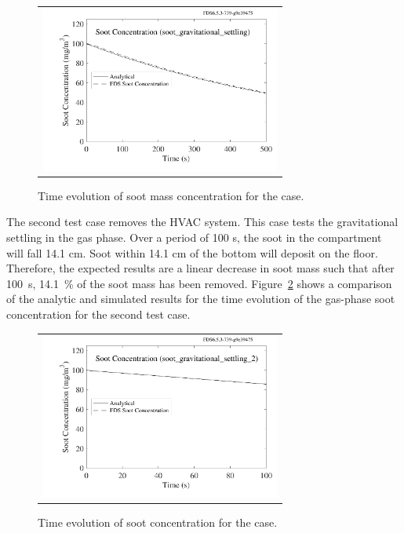 \documentclass[11pt]{book}
\begin{document}
\begin{figure}[ht]
\centering
\begin{tabular}{c}
\includegraphics[width=3.1in]{SCRIPT_FIGURES/soot_gravitational_settling}
\end{tabular}
\caption[Soot mass concentration for  case]{Time evolution of soot mass concentration for the  case.}
\label{fig:soot_gravitational_settling}
\end{figure}

The second test case removes the HVAC system. This case tests the gravitational settling in the gas phase. Over a period of 100 s, the soot in the compartment will fall 14.1 cm. Soot within 14.1 cm of the bottom will deposit on the floor. Therefore, the expected results are a linear decrease in soot mass such that after 100~s, 14.1~\% of the soot mass has been removed. Figure~\ref{fig:soot_gravitational_settling_2} shows a comparison of the analytic and simulated results for the time evolution of the gas-phase soot concentration for the second test case.

\begin{figure}[ht]
\centering
\begin{tabular}{c}
\includegraphics[width=3.1in]{SCRIPT_FIGURES/soot_gravitational_settling_2}
\end{tabular}
\caption[Soot concentration for  case]{Time evolution of soot concentration for the  case.}
\label{fig:soot_gravitational_settling_2}
\end{figure}
\end{document}
